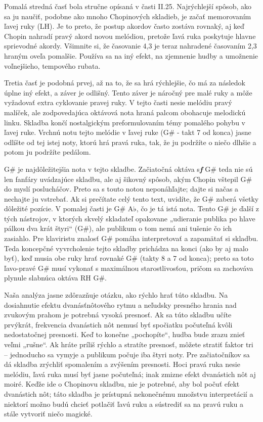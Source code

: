 \documentclass[11pt,a4paper%
]{book}
\begin{document}
Pomalá stredná časť bola stručne opísaná v časti II.25. Najrýchlejší spôsob, ako sa ju naučiť, podobne ako mnoho Chopinových skladieb, je začať memorovaním ľavej ruky (LH). Je to preto, že postup akordov často zostáva rovnaký, aj keď Chopin nahradí pravý akord novou melódiou, pretože ľavá ruka poskytuje hlavne sprievodné akordy. Všimnite si, že časovanie 4,3 je teraz nahradené časovaním 2,3 hraným oveľa pomalšie. Používa sa na iný efekt, na zjemnenie hudby a umožnenie voľnejšieho, tempového rubata.

Tretia časť je podobná prvej, až na to, že sa hrá rýchlejšie, čo má za následok úplne iný efekt, a záver je odlišný. Tento záver je náročný pre malé ruky a môže vyžadovať extra cyklovanie pravej ruky. V tejto časti nesie melódiu pravý malíček, ale zodpovedajúca oktávová nota hraná palcom obohacuje melodickú linku. Skladba končí nostalgickým preformulovaním témy pomalého pohybu v ľavej ruke. Vrchnú notu tejto melódie v ľavej ruke (G\# - takt 7 od konca) jasne odlíšte od tej istej noty, ktorú hrá pravá ruka, tak, že ju podržíte o niečo dlhšie a potom ju podržíte pedálom.

G\# je najdôležitejšia nota v tejto skladbe. Začiatočná oktáva s\emph{\textbf{f}} G\# teda nie sú len fanfáry uvádzajúce skladbu, ale aj šikovný spôsob, akým Chopin vštepil G\# do myslí poslucháčov. Preto sa s touto notou neponáhľajte; dajte si načas a nechajte ju vstrebať. Ak si prečítate celý tento text, uvidíte, že G\# zaberá všetky dôležité pozície. V pomalej časti je G\# A♭, čo je tá istá nota. Tento G\# je ďalší z tých nástrojov, v ktorých skvelý skladateľ opakovane „udieranie publika po hlave pálkou dva krát štyri`` (G\#), ale publikum o tom nemá ani tušenie čo ich zasiahlo. Pre klaviristu znalosť G\# pomáha interpretovať a zapamätať si skladbu. Teda koncepčné vyvrcholenie tejto skladby prichádza na konci (ako by aj malo byť), keď musia obe ruky hrať rovnaké G\# (takty 8 a 7 od konca); preto sa toto ľavo-pravé G\# musí vykonať s maximálnou starostlivosťou, pričom sa zachováva plynule slabnúca oktáva RH G\#.

Naša analýza jasne zdôrazňuje otázku, ako rýchlo hrať túto skladbu. Na dosiahnutie efektu dvanásťnôtového rytmu a neľudsky presného hrania nad zvukovým prahom je potrebná vysoká presnosť. Ak sa túto skladbu učíte prvýkrát, frekvencia dvanástich nôt nemusí byť spočiatku počuteľná kvôli nedostatočnej presnosti. Keď to konečne „pochopíte``, hudba bude zrazu znieť veľmi „rušne``. Ak hráte príliš rýchlo a stratíte presnosť, môžete stratiť faktor tri -- jednoducho sa vymyje a publikum počuje iba štyri noty. Pre začiatočníkov sa dá skladba zrýchliť spomalením a zvýšením presnosti. Hoci pravá ruka nesie melódiu, ľavá ruka musí byť jasne počuteľná; inak zmizne efekt dvanástich nôt aj moiré. Keďže ide o Chopinovu skladbu, nie je potrebné, aby bol počuť efekt dvanástich nôt; táto skladba je prístupná nekonečnému množstvu interpretácií a niektorí možno budú chcieť potlačiť ľavú ruku a sústrediť sa na pravú ruku a stále vytvoriť niečo magické.
\end{document}
